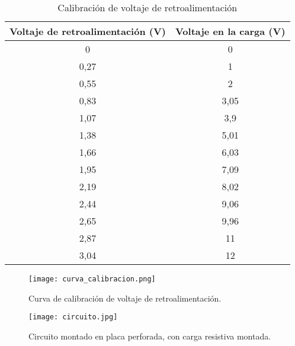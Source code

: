 \begin{table}[H]
    \centering
    \begin{tabular}{|c|c|}
    \hline
    Voltaje de retroalimentación (V) & Voltaje en la carga (V) \\ \hline
    0                                & 0                       \\
    0,27                             & 1                       \\
    0,55                             & 2                       \\
    0,83                             & 3,05                    \\
    1,07                             & 3,9                     \\
    1,38                             & 5,01                    \\
    1,66                             & 6,03                    \\
    1,95                             & 7,09                    \\
    2,19                             & 8,02                    \\
    2,44                             & 9,06                    \\
    2,65                             & 9,96                    \\
    2,87                             & 11                      \\
    3,04                             & 12                      \\ \hline
    \end{tabular}
    \label{tab:calibración_fb}
    \vspace{-0.25cm}
    \caption{Calibración de voltaje de retroalimentación}
\end{table}

\begin{figure}[H]
    \centering
    \texttt{[image: curva\_calibracion.png]}
    \vspace{-0.25cm}
    \caption{Curva de calibración de voltaje de retroalimentación.}
    \label{fig:calibracion}
\end{figure}

\begin{figure}[H]
    \centering
    \texttt{[image: circuito.jpg]}
    \vspace{-0.25cm}
    \caption{Circuito montado en placa perforada, con carga resistiva montada.}
    \label{fig:circuito}
\end{figure}

